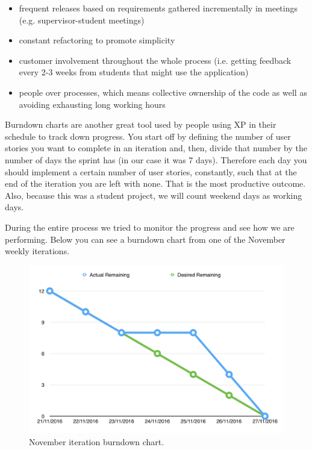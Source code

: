 \documentclass{l4proj}
\begin{document}
\begin{itemize}
\item frequent releases based on requirements gathered incrementally in meetings (e.g. supervisor-student meetings)
\item constant refactoring to promote simplicity
\item customer involvement throughout the whole process (i.e. getting feedback every 2-3 weeks from students that might use the application)
\item people over processes, which means collective ownership of the code as well as avoiding exhausting long working hours
\end{itemize}

Burndown charts are another great tool used by people using XP in their schedule to track down progress. You start off by defining the number of user stories you want to complete in an iteration and, then, divide that number by the number of days the sprint has (in our case it was 7 days). Therefore each day you should implement a certain number of user stories, constantly, such that at the end of the iteration you are left with none. That is the most productive outcome. Also, because this was a student project, we will count weekend days as working days.

During the entire process we tried to monitor the progress and see how we are performing. Below you can see a burndown chart from one of the November weekly iterations.

\begin{figure}[!ht]
\centering
\includegraphics[scale=0.6]{burndown}
\caption{November iteration burndown chart.}
\label{fig:burndown-february}
\end{figure}
\end{document}

